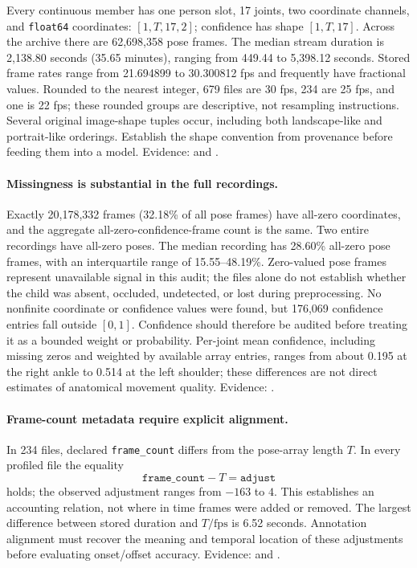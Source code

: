 Every continuous member has one person slot, 17 joints, two coordinate
channels, and \texttt{float64} coordinates: $[1,T,17,2]$; confidence has
shape $[1,T,17]$. Across the archive there are 62,698,358 pose frames.
The median stream duration is 2,138.80 seconds (35.65 minutes), ranging
from 449.44 to 5,398.12 seconds. Stored frame rates range from 21.694899
to 30.300812 fps and frequently have fractional values. Rounded to the
nearest integer, 679 files are 30 fps, 234 are 25 fps, and one is 22 fps;
these rounded groups are descriptive, not resampling instructions.
Several original image-shape tuples occur, including both landscape-like
and portrait-like orderings. Establish the shape convention from provenance
before feeding them into a model. Evidence:
 and
.

\paragraph{Missingness is substantial in the full recordings.}
Exactly 20,178,332 frames (32.18\% of all pose frames) have all-zero
coordinates, and the aggregate all-zero-confidence-frame count is the
same. Two entire recordings have all-zero poses. The median recording has
28.60\% all-zero pose frames, with an interquartile range of
15.55--48.19\%. Zero-valued pose frames represent unavailable signal in
this audit; the files alone do not establish whether the child was absent,
occluded, undetected, or lost during preprocessing. No nonfinite coordinate
or confidence values were found, but 176,069 confidence entries fall
outside $[0,1]$. Confidence should therefore be audited before treating it
as a bounded weight or probability. Per-joint mean confidence, including
missing zeros and weighted by available array entries, ranges from about
0.195 at the right ankle to 0.514 at the left shoulder; these differences
are not direct estimates of anatomical movement quality. Evidence:
.

\paragraph{Frame-count metadata require explicit alignment.}
In 234 files, declared \texttt{frame\_count} differs from the pose-array
length $T$. In every profiled file the equality
\begin{equation}
 \texttt{frame\_count}-T=\texttt{adjust}
\end{equation}
holds; the observed adjustment ranges from $-163$ to $4$.
This establishes an accounting relation, not where in time frames were
added or removed. The largest difference between stored duration and
$T/\mathrm{fps}$ is 6.52 seconds. Annotation alignment must recover the
meaning and temporal location of these adjustments before evaluating
onset/offset accuracy. Evidence:
 and
.
